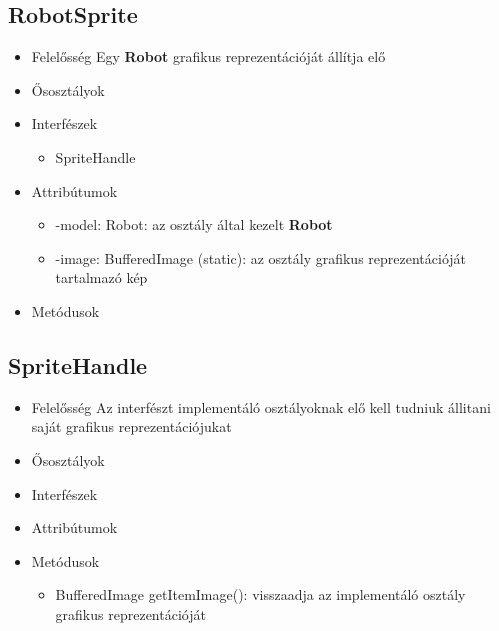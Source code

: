 \subsection{RobotSprite}
\begin{itemize}
\item Felelősség \newline
    Egy \textbf{Robot} grafikus reprezentációját állítja elő
\item Ősosztályok
\item Interfészek
    \begin{itemize}
        \item SpriteHandle
    \end{itemize}
\item Attribútumok
    \begin{itemize}
        \item -model: Robot: az osztály által kezelt \textbf{Robot}
        \item -image: BufferedImage (static): az osztály grafikus reprezentációját tartalmazó kép
    \end{itemize}
\item Metódusok
\end{itemize}

\subsection{SpriteHandle}
\begin{itemize}
\item Felelősség \newline
    Az interfészt implementáló osztályoknak elő kell tudniuk állitani saját grafikus reprezentációjukat
\item Ősosztályok
\item Interfészek
\item Attribútumok
\item Metódusok
	\begin{itemize}
        \item BufferedImage getItemImage(): visszaadja az implementáló osztály grafikus reprezentációját
	\end{itemize}
\end{itemize}

